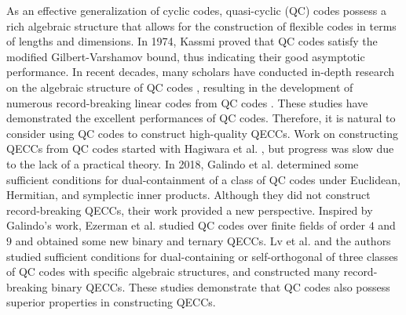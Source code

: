 \documentclass[journal]{IEEEtran}
\begin{document}
As an effective generalization of cyclic codes, quasi-cyclic (QC) codes possess a rich algebraic structure that allows for the construction of flexible codes in terms of lengths and dimensions. In 1974, Kassmi \cite{kasami1974gilbert} proved that QC codes satisfy the modified Gilbert-Varshamov bound, thus indicating their good asymptotic performance. In recent decades, many scholars have conducted in-depth research on the algebraic structure of QC codes \cite{ling2001algebraic,guneri2012concatenated,semenov2012spectral,ezerman2021comparison}, 
resulting in the development of numerous record-breaking linear codes from QC codes \cite{aydin2001structure,daskalov2003new,Chen2016NewBH,aydin2019equivalence}. These studies have demonstrated the excellent performances of QC codes. Therefore, it is natural to consider using QC codes to construct high-quality QECCs. 
Work on constructing QECCs from QC codes started with Hagiwara et al. \cite{hagiwara2007quantum}, but progress was slow due to the lack of a practical theory. 
In 2018, Galindo et al. \cite{galindo2018quasi} determined some sufficient conditions for dual-containment of a class of QC codes under Euclidean, Hermitian, and symplectic inner products. 
Although they did not construct record-breaking QECCs, their work provided a new perspective.
Inspired by Galindo's work, Ezerman et al. \cite{ezerman2019good} studied QC codes over finite fields of order $4$ and $9$ and obtained some new binary and ternary QECCs.
Lv et al. \cite{lv2020explicit,lv2020constructions} and the authors \cite{guan2022construction,guan2022new} studied sufficient conditions for dual-containing or self-orthogonal of three classes of QC codes with specific algebraic structures, and constructed many record-breaking binary QECCs. These studies demonstrate that QC codes also possess superior properties in constructing QECCs.
\end{document}
